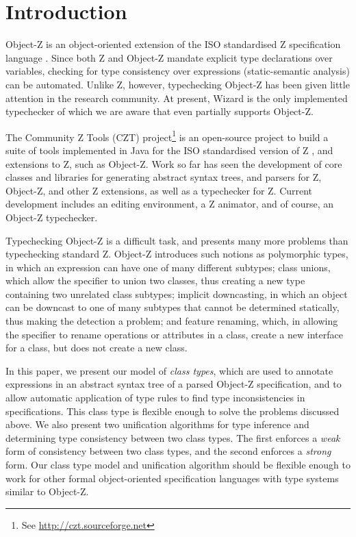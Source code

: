 \section{Introduction}

Object-Z \cite{smith00} is an object-oriented extension of the ISO
standardised Z specification language \cite{isoz}. Since both Z
and Object-Z mandate explicit type declarations over variables,
checking for type consistency over expressions (static-semantic
analysis) can be automated. Unlike Z, however, typechecking Object-Z
has been given little attention in the research community.  At
present, Wizard \cite{johnston96} is the only implemented typechecker
of which we are aware that even partially supports Object-Z.

The Community Z Tools (CZT) project\footnote{See
\url{http://czt.sourceforge.net}} is an open-source project to build a
suite of tools implemented in Java for the ISO standardised version of
Z \cite{isoz}, and extensions to Z, such as Object-Z. Work so far has
seen the development of core classes and libraries for generating
abstract syntax trees, and parsers for Z, Object-Z, and other Z
extensions, as well as a typechecker for Z. Current development
includes an editing environment, a Z animator, and of course, an
Object-Z typechecker.

Typechecking Object-Z is a difficult task, and presents many more
problems than typechecking standard Z. Object-Z introduces such
notions as polymorphic types, in which an expression can have one of
many different subtypes; class unions, which allow the specifier to
union two classes, thus creating a new type containing two unrelated
class subtypes; implicit downcasting, in which an object can be
downcast to one of many subtypes that cannot be determined statically,
thus making the detection a problem; and feature renaming, which, in
allowing the specifier to rename operations or attributes in a class,
create a new interface for a class, but does not create a new class.

In this paper, we present our model of {\em class types}, which are
used to annotate expressions in an abstract syntax tree of a parsed
Object-Z specification, and to allow automatic application of type
rules to find type inconsistencies in specifications. This class type
is flexible enough to solve the problems discussed above. We also
present two unification algorithms for type inference and determining
type consistency between two class types. The first enforces a {\em
weak} form of consistency between two class types, and the second
enforces a {\em strong} form. Our class type model and unification
algorithm should be flexible enough to work for other formal
object-oriented specification languages with type systems similar to
Object-Z.
